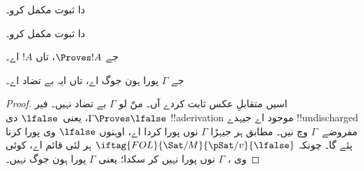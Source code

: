 \documentclass[../../../include/open-logic-section]{subfiles}
\begin{document}
\begin{prob}
 دا ثبوت مکمل کرو۔
\end{prob}
\tagendprob

\begin{prob}
 دا ثبوت مکمل کرو۔
\end{prob}
\tagendprob

\begin{cor}
جے $\Proves !A$، تاں $!A$  اے۔
\end{cor}

\begin{cor}
جے $\Gamma$ پورا ہون جوگ اے، تاں ایہ بے تضاد اے۔
\end{cor}

\begin{proof}
اسیں متقابلِ عکس ثابت کردے آں۔ منّ لو $\Gamma$ بے تضاد نہیں۔
فیر $\Gamma \Proves \lfalse$، یعنی~$\lfalse$ دی !!a{derivation}
موجود اے جیہدے !!{undischarged} مفروضے~$\Gamma$ وچ نیں۔
 مطابق ہر
جیہڑا $\Gamma$ نوں پورا کردا اے، اوہنوں $\lfalse$ وی پورا کرنا
پئے گا۔ چونکہ
$\iftag{FOL}{\Sat/{M}}{\pSat/{v}}{\lfalse}$ ہر
لئی قائم اے،
کوئی وی ،
$\Gamma$ نوں پورا نہیں کر سکدا؛ یعنی $\Gamma$ پورا ہون جوگ نہیں۔
\end{proof}
\end{document}
